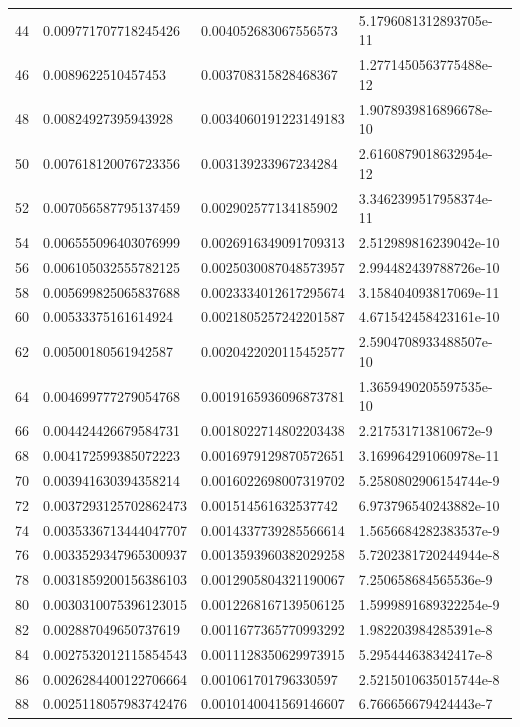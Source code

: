 \documentclass[11pt]{article}
\begin{document}
\begin{tabular}{| c | l | l | l | }
44 & 0.009771707718245426 & 0.004052683067556573 & 5.1796081312893705e-11 \\ 
46 & 0.0089622510457453 & 0.003708315828468367 & 1.2771450563775488e-12 \\ 
48 & 0.00824927395943928 & 0.0034060191223149183 & 1.9078939816896678e-10 \\ 
50 & 0.007618120076723356 & 0.003139233967234284 & 2.6160879018632954e-12 \\ 
52 & 0.007056587795137459 & 0.002902577134185902 & 3.3462399517958374e-11 \\ 
54 & 0.006555096403076999 & 0.0026916349091709313 & 2.512989816239042e-10 \\ 
56 & 0.006105032555782125 & 0.0025030087048573957 & 2.994482439788726e-10 \\ 
58 & 0.005699825065837688 & 0.0023334012617295674 & 3.158404093817069e-11 \\ 
60 & 0.00533375161614924 & 0.0021805257242201587 & 4.671542458423161e-10 \\ 
62 & 0.00500180561942587 & 0.0020422020115452577 & 2.5904708933488507e-10 \\ 
64 & 0.004699777279054768 & 0.0019165936096873781 & 1.3659490205597535e-10 \\ 
66 & 0.004424426679584731 & 0.0018022714802203438 & 2.217531713810672e-9 \\ 
68 & 0.004172599385072223 & 0.0016979129870572651 & 3.169964291060978e-11 \\ 
70 & 0.003941630394358214 & 0.0016022698007319702 & 5.2580802906154744e-9 \\ 
72 & 0.0037293125702862473 & 0.001514561632537742 & 6.973796540243882e-10 \\ 
74 & 0.0035336713444047707 & 0.0014337739285566614 & 1.5656684282383537e-9 \\ 
76 & 0.0033529347965300937 & 0.0013593960382029258 & 5.7202381720244944e-8 \\ 
78 & 0.0031859200156386103 & 0.0012905804321190067 & 7.250658684565536e-9 \\ 
80 & 0.0030310075396123015 & 0.0012268167139506125 & 1.5999891689322254e-9 \\ 
82 & 0.002887049650737619 & 0.0011677365770993292 & 1.982203984285391e-8 \\ 
84 & 0.0027532012115854543 & 0.0011128350629973915 & 5.295444638342417e-8 \\ 
86 & 0.0026284400122706664 & 0.001061701796330597 & 2.5215010635015744e-8 \\ 
88 & 0.0025118057983742476 & 0.0010140041569146607 & 6.766656679424443e-7 \\ 

\end{tabular}
\end{document}
